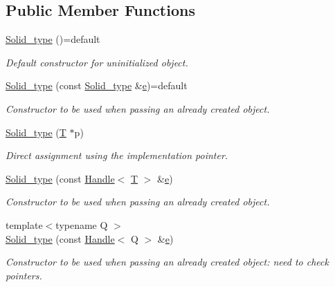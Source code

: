 \subsection*{Public Member Functions}
\begin{DoxyCompactItemize}
\item 
\hyperlink{class_d_d4hep_1_1_geometry_1_1_solid__type_a6bbf7e29a4fff256be29a4d5455ec978}{Solid\+\_\+type} ()=default
\begin{DoxyCompactList}\small\item\em Default constructor for uninitialized object. \end{DoxyCompactList}\item 
\hyperlink{class_d_d4hep_1_1_geometry_1_1_solid__type_a94dd4d06930486a7f2a698299decaf24}{Solid\+\_\+type} (const \hyperlink{class_d_d4hep_1_1_geometry_1_1_solid__type}{Solid\+\_\+type} \&\hyperlink{_volumes_8cpp_a8a9a1f93e9b09afccaec215310e64142}{e})=default
\begin{DoxyCompactList}\small\item\em Constructor to be used when passing an already created object. \end{DoxyCompactList}\item 
\hyperlink{class_d_d4hep_1_1_geometry_1_1_solid__type_a2788d7317836c7fa98581c4b78d871a7}{Solid\+\_\+type} (\hyperlink{class_t}{T} $\ast$p)
\begin{DoxyCompactList}\small\item\em Direct assignment using the implementation pointer. \end{DoxyCompactList}\item 
\hyperlink{class_d_d4hep_1_1_geometry_1_1_solid__type_a153b1496923f3a094a13bfb57e73a81e}{Solid\+\_\+type} (const \hyperlink{class_d_d4hep_1_1_handle}{Handle}$<$ \hyperlink{class_t}{T} $>$ \&\hyperlink{_volumes_8cpp_a8a9a1f93e9b09afccaec215310e64142}{e})
\begin{DoxyCompactList}\small\item\em Constructor to be used when passing an already created object. \end{DoxyCompactList}\item 
{\footnotesize template$<$typename Q $>$ }\\\hyperlink{class_d_d4hep_1_1_geometry_1_1_solid__type_ad3ad0b3e5f7d6120b97daedb0d0a85dc}{Solid\+\_\+type} (const \hyperlink{class_d_d4hep_1_1_handle}{Handle}$<$ Q $>$ \&\hyperlink{_volumes_8cpp_a8a9a1f93e9b09afccaec215310e64142}{e})
\begin{DoxyCompactList}\small\item\em Constructor to be used when passing an already created object\+: need to check pointers. \end{DoxyCompactList}\item 

\end{DoxyCompactItemize}
